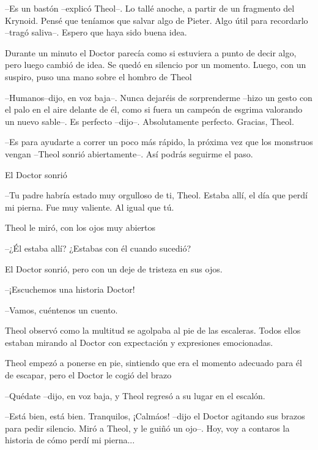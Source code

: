 --Es un bastón --explicó Theol--. Lo tallé anoche, a partir de un fragmento del Krynoid. Pensé que teníamos que salvar algo de Pieter. Algo útil para recordarlo --tragó saliva--. Espero que haya sido buena idea.



Durante un minuto el Doctor parecía como si estuviera a punto de decir algo, pero luego cambió de idea. Se quedó en silencio por un momento. Luego, con un suspiro, puso una mano sobre el hombro de Theol 

--Humanos--dijo, en voz baja--. Nunca dejaréis de sorprenderme --hizo un gesto con el palo en el aire delante de él, como si fuera un campeón de esgrima valorando un nuevo sable--. Es perfecto --dijo--. Absolutamente perfecto. Gracias, Theol.



--Es para ayudarte a correr un poco más rápido, la próxima vez que los monstruos vengan --Theol sonrió abiertamente--. Así podrás seguirme el paso.



El Doctor sonrió 

--Tu padre habría estado muy orgulloso de ti, Theol. Estaba allí, el día que perdí mi pierna. Fue muy valiente. Al igual que tú.



Theol le miró, con los ojos muy abiertos 

--¿Él estaba allí? ¿Estabas con él cuando sucedió?



El Doctor sonrió, pero con un deje de tristeza en sus ojos.



--¡Escuchemos una historia Doctor!



--Vamos, cuéntenos un cuento.



Theol observó como la multitud se agolpaba al pie de las escaleras. Todos ellos estaban mirando al Doctor con expectación y expresiones emocionadas.



Theol empezó a ponerse en pie, sintiendo que era el momento adecuado para él de escapar, pero el Doctor le cogió del brazo 

--Quédate --dijo, en voz baja, y Theol regresó a su lugar en el escalón.



--Está bien, está bien. Tranquilos, ¡Calmáos! --dijo el Doctor agitando sus brazos para pedir silencio. Miró a Theol, y le guiñó un ojo--. Hoy, voy a contaros la historia de cómo perdí mi pierna...
